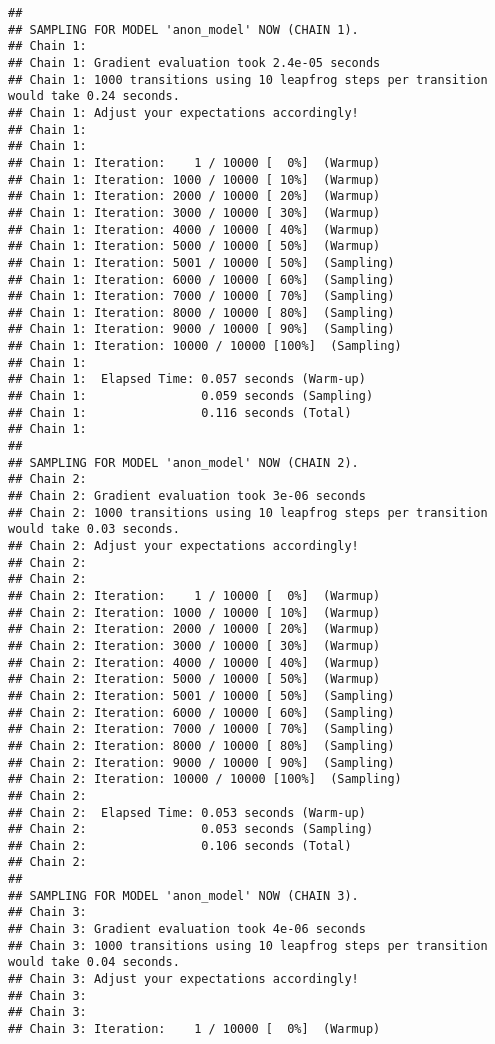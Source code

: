 \documentclass[
]{article}
\begin{document}
\begin{verbatim}
## 
## SAMPLING FOR MODEL 'anon_model' NOW (CHAIN 1).
## Chain 1: 
## Chain 1: Gradient evaluation took 2.4e-05 seconds
## Chain 1: 1000 transitions using 10 leapfrog steps per transition would take 0.24 seconds.
## Chain 1: Adjust your expectations accordingly!
## Chain 1: 
## Chain 1: 
## Chain 1: Iteration:    1 / 10000 [  0%]  (Warmup)
## Chain 1: Iteration: 1000 / 10000 [ 10%]  (Warmup)
## Chain 1: Iteration: 2000 / 10000 [ 20%]  (Warmup)
## Chain 1: Iteration: 3000 / 10000 [ 30%]  (Warmup)
## Chain 1: Iteration: 4000 / 10000 [ 40%]  (Warmup)
## Chain 1: Iteration: 5000 / 10000 [ 50%]  (Warmup)
## Chain 1: Iteration: 5001 / 10000 [ 50%]  (Sampling)
## Chain 1: Iteration: 6000 / 10000 [ 60%]  (Sampling)
## Chain 1: Iteration: 7000 / 10000 [ 70%]  (Sampling)
## Chain 1: Iteration: 8000 / 10000 [ 80%]  (Sampling)
## Chain 1: Iteration: 9000 / 10000 [ 90%]  (Sampling)
## Chain 1: Iteration: 10000 / 10000 [100%]  (Sampling)
## Chain 1: 
## Chain 1:  Elapsed Time: 0.057 seconds (Warm-up)
## Chain 1:                0.059 seconds (Sampling)
## Chain 1:                0.116 seconds (Total)
## Chain 1: 
## 
## SAMPLING FOR MODEL 'anon_model' NOW (CHAIN 2).
## Chain 2: 
## Chain 2: Gradient evaluation took 3e-06 seconds
## Chain 2: 1000 transitions using 10 leapfrog steps per transition would take 0.03 seconds.
## Chain 2: Adjust your expectations accordingly!
## Chain 2: 
## Chain 2: 
## Chain 2: Iteration:    1 / 10000 [  0%]  (Warmup)
## Chain 2: Iteration: 1000 / 10000 [ 10%]  (Warmup)
## Chain 2: Iteration: 2000 / 10000 [ 20%]  (Warmup)
## Chain 2: Iteration: 3000 / 10000 [ 30%]  (Warmup)
## Chain 2: Iteration: 4000 / 10000 [ 40%]  (Warmup)
## Chain 2: Iteration: 5000 / 10000 [ 50%]  (Warmup)
## Chain 2: Iteration: 5001 / 10000 [ 50%]  (Sampling)
## Chain 2: Iteration: 6000 / 10000 [ 60%]  (Sampling)
## Chain 2: Iteration: 7000 / 10000 [ 70%]  (Sampling)
## Chain 2: Iteration: 8000 / 10000 [ 80%]  (Sampling)
## Chain 2: Iteration: 9000 / 10000 [ 90%]  (Sampling)
## Chain 2: Iteration: 10000 / 10000 [100%]  (Sampling)
## Chain 2: 
## Chain 2:  Elapsed Time: 0.053 seconds (Warm-up)
## Chain 2:                0.053 seconds (Sampling)
## Chain 2:                0.106 seconds (Total)
## Chain 2: 
## 
## SAMPLING FOR MODEL 'anon_model' NOW (CHAIN 3).
## Chain 3: 
## Chain 3: Gradient evaluation took 4e-06 seconds
## Chain 3: 1000 transitions using 10 leapfrog steps per transition would take 0.04 seconds.
## Chain 3: Adjust your expectations accordingly!
## Chain 3: 
## Chain 3: 
## Chain 3: Iteration:    1 / 10000 [  0%]  (Warmup)

\end{verbatim}
\end{document}
